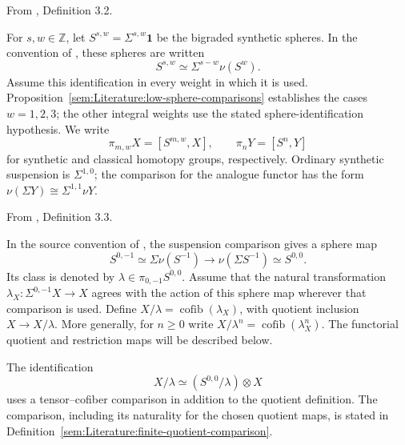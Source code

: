 \begin{definition}
\label{paper:3.2}
From \cite{LWX126}, Definition 3.2.\par


For $s,w\in\mathbb Z$, let $S^{s,w}=\Sigma^{s,w}\mathbf1$ be the
bigraded synthetic spheres. In the convention of
\cite[Definition 4.6]{Pst}, these spheres are written
\[
 S^{s,w}\simeq\Sigma^{s-w}\nu(S^w).
\]
Assume this identification in every weight in which it is used.
Proposition~\ref{sem:Literature:low-sphere-comparisons} establishes the
cases $w=1,2,3$; the other integral weights use the stated sphere-identification
hypothesis.
We write
\[
 \pi_{m,w}X=[S^{m,w},X],\qquad \pi_nY=[S^n,Y]
\]
for synthetic and classical homotopy groups, respectively.
Ordinary synthetic suspension is $\Sigma^{1,0}$; the comparison for the
analogue functor has the form $\nu(\Sigma Y)\cong\Sigma^{1,1}\nu Y$.



\sketch
\end{definition}


\begin{definition}
\label{paper:3.3}
From \cite{LWX126}, Definition 3.3.\par

In the source convention of \cite[Definition 4.27]{Pst}, the
suspension comparison gives a sphere map
\[
 S^{0,-1}\simeq\Sigma\nu(S^{-1})\longrightarrow
 \nu(\Sigma S^{-1})\simeq S^{0,0}.
\]
Its class is denoted by $\lambda\in\pi_{0,-1}S^{0,0}$.
Assume that the natural transformation
$\lambda_X:\Sigma^{0,-1}X\to X$ agrees with the action of this
sphere map wherever that comparison is used.
Define $X/\lambda=\operatorname{cofib}(\lambda_X)$, with quotient
inclusion $X\to X/\lambda$. More generally, for $n\geq0$ write
$X/\lambda^n=\operatorname{cofib}(\lambda_X^n)$. The functorial
quotient and restriction maps will be described below.

The identification
\[
 X/\lambda\simeq(S^{0,0}/\lambda)\otimes X
\]
uses a tensor--cofiber comparison in addition to the quotient definition.
The comparison, including its naturality for the chosen quotient maps,
is stated in Definition~\ref{sem:Literature:finite-quotient-comparison}.



\sketch
\end{definition}



